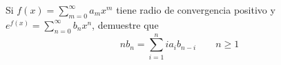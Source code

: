 \item Si $f(x) = \displaystyle\sum_{m=0}^\infty a_m x^m$ tiene radio de convergencia positivo y $e^{f(x)} = \displaystyle\sum_{n=0}^\infty b_n x^n$, demuestre que
    \[ n b_n = \sum_{i=1}^n i a_i b_{n-i} \qquad n \ge 1 \]
